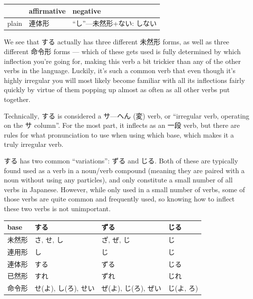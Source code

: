 \documentclass[11pt, b5paper, twoside, openright, onecolumn]{book}
\makeatletter
\newcommand*{\rubystack}[2]{{\relscale{0.5}%
  \begin{tabular}[b]{@{}c@{}}%
    {#1}\\%
   {\textscale{2}{#2}}%
  \end{tabular}}%
}
\DeclareRobustCommand*{\ruby}[2]{%
  \mbox{%
    \setlength{\parskip}{0ex}%
    \BeginAccSupp{method=pdfstringdef,ActualText={#1}}%
      \rubystack{\phantom{#2}}{#1}%
      \llap{%
        \rubystack{#2}{\phantom{#1}}%
      }%
    \EndAccSupp{}%
  }%
}
\renewcommand*{\ruby}[2]{#2 (#1)}%
\newenvironment{mytabular}[1]{\noindent\hspace{0.4in}
\begin{tabular}[h]{#1}}{\end{tabular}}
\makeatother
\begin{document}
\smaller
\begin{mytabular}{| l  l  l |}\hline 
\rule{0pt}{2.4ex} & affirmative & negative\\ 
\hline
\rule{0pt}{2.4ex}plain & 連体形 & “し”—未然形+ない: しない\\ 
\hline 
\end{mytabular}
\larger
\vspace{0.5cm}


We see that する actually has three different 未然形 forms‚ as well as three different 命令形 forms — which of these gets used is fully determined by which inflection you’re going for‚ making this verb a bit trickier than any of the other verbs in the language. Luckily‚ it’s such a common verb that even though it’s highly irregular you will most likely become familiar with all its inflections fairly quickly by virtue of them popping up almost as often as all other verbs put together.

Technically‚ する is considered a サ—\ruby{変}{へん} verb‚ or “irregular verb‚ operating on the サ column”. For the most part‚ it inflects as an 一段 verb‚ but there are rules for what pronunciation to use when using which base‚ which makes it a truly irregular verb.

する has two common “variations”: ずる and じる. Both of these are typically found used as a verb in a noun/verb compound (meaning they are paired with a noun without using any particles)‚ and only constitute a small number of all verbs in Japanese. However‚ while only used in a small number of verbs‚ some of those verbs are quite common and frequently used‚ so knowing how to inflect these two verbs is not unimportant.

\vspace{0.5cm}
\smaller
\begin{mytabular}{| l  l  l  l |}\hline 
\rule{0pt}{2.4ex}base & する & ずる & じる\\ 
\hline
\rule{0pt}{2.4ex}未然形 & さ‚ せ‚ し & ざ‚ ぜ‚ じ & じ\\ 
\rule{0pt}{2.4ex}連用形 & し & じ & じ\\ 
\rule{0pt}{2.4ex}連体形 & する & ずる & じる\\ 
\rule{0pt}{2.4ex}已然形 & すれ & ずれ & じれ\\ 
\rule{0pt}{2.4ex}命令形 & せ(よ)‚ し(ろ)‚ せい & ぜ(よ)‚ じ(ろ)‚ ぜい & じ(よ‚ ろ)\\ 
\hline 
\end{mytabular}
\larger
\vspace{0.5cm}
\end{document}
